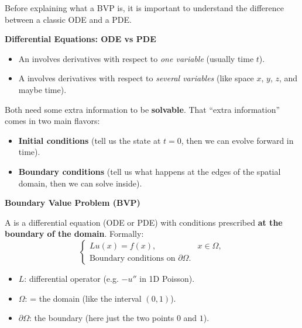 \begin{deepeningbox}
    Before explaining what a BVP is, it is important to understand the difference between a classic ODE and a PDE.

    \highspace
    \begin{flushleft}
        \textcolor{Green3}{ \textbf{Differential Equations: ODE vs PDE}}
    \end{flushleft}
    \begin{itemize}
        \item An  involves derivatives with respect to \emph{one variable} (usually time $t$).
        \item A  involves derivatives with respect to \emph{several variables} (like space $x$, $y$, $z$, and maybe time).
    \end{itemize}
    Both need some extra information to be \textbf{solvable}. That ``extra information'' comes in two main flavors:
    \begin{itemize}
        \item \textbf{Initial conditions} (tell us the state at $t=0$, then we can evolve forward in time).
        \item \textbf{Boundary conditions} (tell us what happens at the edges of the spatial domain, then we can solve inside).
    \end{itemize}

    \highspace
    \begin{flushleft}
        \textcolor{Green3}{ \textbf{Boundary Value Problem (BVP)}}
    \end{flushleft}
    A  is a differential equation (ODE or PDE) with conditions prescribed \textbf{at the boundary of the domain}. Formally:
    \begin{equation*}
        \begin{cases}
            Lu(x) = f(x), & x \in \Omega, \\
            \text{Boundary conditions on } \partial \Omega.
        \end{cases}
    \end{equation*}
    \begin{itemize}
        \item $L$: differential operator (e.g. $ -u''$ in 1D Poisson).
        \item $\Omega$: = the domain (like the interval $(0,1)$).
        \item $\partial\Omega$: the boundary (here just the two points $0$ and $1$).
    \end{itemize}
\end{deepeningbox}


